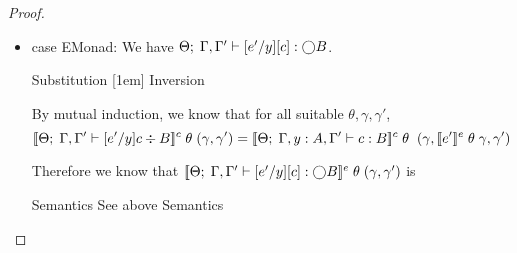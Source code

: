 \begin{proof}
\begin{itemize}
  \begin{eqnproof}
          {}
          [1em]
          {}
             {}
          {}
  \end{eqnproof}

  Which means that
  \begin{displaymath}
    iter_C[i,s]\;a = \interpE{\judgeE{\Gamma, y:A, \Gamma'}{\iter{e}{[e'/y]e_0}{x}{[e'/y]e_1}}{C}}    \;\theta\;(\gamma, \interpE{e'}\;\theta\;\gamma, \gamma')
  \end{displaymath}

\item case EMonad: We have ${\Theta};\;{\Gamma, \Gamma'} \vdash {[e'/y][c]} : {\bigcirc{B}}$. 

  \begin{eqnproof}
          {Substitution}
          [1em]
           {Inversion}
  \end{eqnproof}

  By mutual induction, we know that for all suitable $\theta, \gamma, \gamma'$,
  \begin{displaymath}
   [\![{{\Theta};\;{\Gamma,\Gamma'} \vdash {[e'/y]c} \div {B}}]\!]^c\;\theta\;(\gamma,\gamma') = 
   [\![{{\Theta};\;{\Gamma, y:A, \Gamma'} \vdash {c} : {B}}]\!]^c
           \;\theta\;
           \;(\gamma, [\![{e'}]\!]^e\;\theta\;\gamma, \gamma')
  \end{displaymath}

  Therefore we know that $[\![{{\Theta};\;{\Gamma, \Gamma'} \vdash {[e'/y][c]} : {\bigcirc{B}}}]\!]^e\;\theta\;(\gamma, \gamma')$ is

  \begin{eqnproof}
          {Semantics}
          {See above}
          {Semantics}
  \end{eqnproof}


\end{itemize}
\end{proof}
